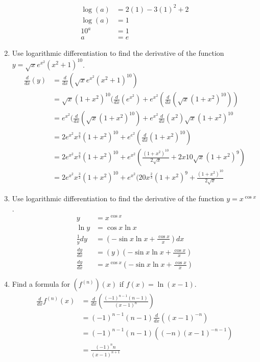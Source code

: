 \documentclass{article}
\begin{document}
\begin{enumerate}
$$\begin{align}
		\log(a)&=2(1)-3(1)^2+2\\
		\log(a)&=1\\
		10^a&=1\\
		a&=e
	\end{align}$$
\setcounter{enumi}{33}
	\item Use logarithmic differentiation to find the derivative of the function $y=\sqrt{x}e^x^2(x^2+1)^{10}$.
	$$\begin{align}
		\frac{d}{dx}(y)&=\frac{d}{dx}(\sqrt{x}e^x^2(x^2+1)^{10})\\
		&=\sqrt{x}(1+x^2)^{10}(\frac{d}{dx}(e^{x^2})+e^{x^2}(\frac{d}{dx}(\sqrt{x}(1+x^2)^{10} ))\\
		&=e^{x^2}(\frac{d}{dx}(\sqrt{x}(1+x^2)^{10})+e^{x^2}\frac{d}{dx}(x^2)\sqrt{x}(1+x^2)^{10}\\
		&=2e^{x^2}x^{\frac{3}{2}}(1+x^2)^{10}+e^{e^2}(\frac{d}{dx}(1+x^2)^{10})\\
		&=2e^{x^2}x^{\frac{3}{2}}(1+x^2)^{10}+e^{x^2}(\frac{(1+x^2)^{10}}{2\sqrt{x}}+2x10\sqrt{x}(1+x^2)^9)\\
		&=\boxed{2e^{x^2}x^{\frac{3}{2}}(1+x^2)^{10}+e^{x^2}(20x^{\frac{2}{3}}(1+x^2)^9+\frac{(1+x^2)^{10}}{2\sqrt{x}}}
	\end{align}$$
\setcounter{enumi}{37}
	\item Use logarithmic differentiation to find the derivative of the function $y=x^{\cos x}$.
	$$\begin{align}
		y&=x^{\cos x}\\
		\ln y &= \cos x \ln x\\
		\frac{1}{y}dy &= (-\sin x \ln x + \frac{\cos x}{x} )dx\\
		\frac{dy}{dx} &= (y)(-\sin x \ln x + \frac{\cos x}{x} )\\
		\frac{dy}{dx} &= \boxed{x^{\cos x} (-\sin x \ln x + \frac{\cos x}{x} )}
	\end{align}$$
\setcounter{enumi}{44}
	\item Find a formula for $(f^{(n)})(x)$ if $f(x)=\ln(x-1)$.
	$$\begin{align}
		\frac{d}{dx}f^{(n)}(x)&=\frac{d}{dx}\left( \frac{(-1)^{n-1}(n-1)}{(x-1)^n}\right) \\
		&= (-1)^{n-1}(n-1)\frac{d}{dx}\left((x-1)^{-n}\right) \\
		&= (-1)^{n-1}(n-1)\left( (-n)(x-1)^{-n-1}\right) \\
		&= \boxed{\frac{(-1)^{n}n}{(x-1)^{n+1}}} \\
	\end{align}$$
\end{enumerate}
\end{document}
